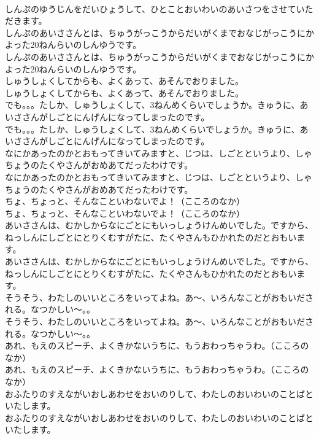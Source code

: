 \documentclass[8pt]{extreport}
\begin{document}
\begin{CJK}{UTF8}{min}
\\	しんぷのゆうじんをだいひょうして、ひとことおいわいのあいさつをさせていただきます。 
\\	しんぷのあいささんとは、ちゅうがっこうからだいがくまでおなじがっこうにかよった20ねんらいのしんゆうです。	
\\	しんぷのあいささんとは、ちゅうがっこうからだいがくまでおなじがっこうにかよった20ねんらいのしんゆうです。 
\\	しゅうしょくしてからも、よくあって、あそんでおりました。	
\\	しゅうしょくしてからも、よくあって、あそんでおりました。 
\\	でも。。。たしか、しゅうしょくして、3ねんめくらいでしょうか。きゅうに、あいささんがしごとにんげんになってしまったのです。	
\\	でも。。。たしか、しゅうしょくして、3ねんめくらいでしょうか。きゅうに、あいささんがしごとにんげんになってしまったのです。 
\\	なにかあったのかとおもってきいてみますと、じつは、しごとというより、しゃちょうのたくやさんがおめあてだったわけです。	
\\	なにかあったのかとおもってきいてみますと、じつは、しごとというより、しゃちょうのたくやさんがおめあてだったわけです。 
\\	ちょ、ちょっと、そんなこといわないでよ！（こころのなか）	
\\	ちょ、ちょっと、そんなこといわないでよ！（こころのなか） 
\\	あいささんは、むかしからなにごとにもいっしょうけんめいでした。ですから、ねっしんにしごとにとりくむすがたに、たくやさんもひかれたのだとおもいます。	
\\	あいささんは、むかしからなにごとにもいっしょうけんめいでした。ですから、ねっしんにしごとにとりくむすがたに、たくやさんもひかれたのだとおもいます。 
\\	そうそう、わたしのいいところをいってよね。あ～、いろんなことがおもいだされる。なつかしい～。。	
\\	そうそう、わたしのいいところをいってよね。あ～、いろんなことがおもいだされる。なつかしい～。。 
\\	あれ、もえのスピーチ、よくきかないうちに、もうおわっちゃうわ。（こころのなか）	
\\	あれ、もえのスピーチ、よくきかないうちに、もうおわっちゃうわ。（こころのなか） 
\\	おふたりのすえながいおしあわせをおいのりして、わたしのおいわいのことばといたします。	
\\	おふたりのすえながいおしあわせをおいのりして、わたしのおいわいのことばといたします。 

\end{CJK}
\end{document}
